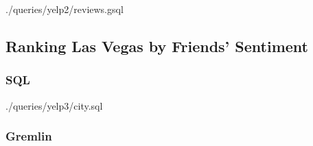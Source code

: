 
{./queries/yelp2/reviews.gsql}

\subsection{Ranking Las Vegas by Friends' Sentiment}

\subsubsection{SQL}



{./queries/yelp3/city.sql}

\subsubsection{Gremlin}



